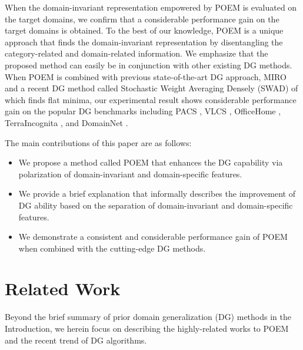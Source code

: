 \documentclass[letterpaper]{article} \usepackage{aaai23}  \usepackage{times}  \usepackage{helvet}  \usepackage{courier}  \usepackage[hyphens]{url}  \usepackage{graphicx} \urlstyle{rm} \def\UrlFont{\rm}  \usepackage{natbib}  \usepackage{caption} \frenchspacing  \setlength{\pdfpagewidth}{8.5in}  \setlength{\pdfpageheight}{11in}  \usepackage[labelsep=period]{caption}
\begin{document}
When the domain-invariant representation empowered by POEM is evaluated on the target domains, we confirm that a considerable performance gain on the target domains is obtained. To the best of our knowledge, POEM is a unique approach that finds the domain-invariant representation by disentangling the category-related and domain-related information. We emphasize that the proposed method can easily be in conjunction with other existing DG methods.
When POEM is combined with previous state-of-the-art DG approach, MIRO\cite{MIRO} and a recent DG method called Stochastic Weight Averaging Densely (SWAD) of \cite{SWAD} which finds flat minima, our experimental result shows considerable performance gain on the popular DG benchmarks including PACS \cite{PACS}, VLCS \cite{VLCS}, OfficeHome \cite{officehome}, TerraIncognita \cite{terraincognita}, and DomainNet \cite{DomainNet}.

\fi

The main contributions of this paper are as follows:
\begin{itemize}
	\item We propose a method called POEM that enhances the DG capability via polarization of domain-invariant and domain-specific features.
	\item We provide a brief explanation that informally describes the improvement of DG ability based on the separation of domain-invariant and domain-specific features.
	\item We demonstrate a consistent and considerable performance gain of POEM when combined with the cutting-edge DG methods. 
\end{itemize}

\section{Related Work}
Beyond the brief summary of prior domain generalization (DG) methods in the Introduction, we herein focus on describing the highly-related works to POEM and the recent trend of DG algorithms. 
\end{document}

